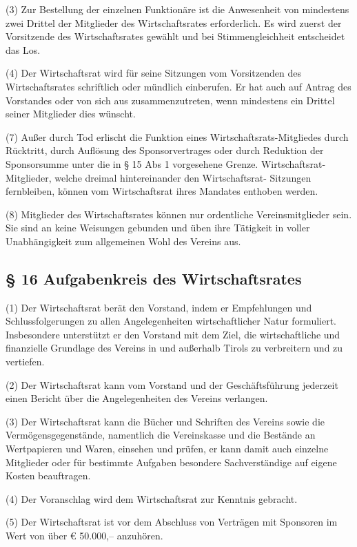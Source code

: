 \documentclass[10pt,a4paper]{article}
\begin{document}
(3)
Zur Bestellung der einzelnen Funktionäre ist die Anwesenheit von mindestens zwei Drittel der Mitglieder des Wirtschaftsrates erforderlich.
Es wird zuerst der Vorsitzende des Wirtschaftsrates gewählt und bei Stimmengleichheit entscheidet das Los.

(4)
Der Wirtschaftsrat wird für seine Sitzungen vom Vorsitzenden des Wirtschaftsrates schriftlich oder mündlich einberufen.
Er hat auch auf Antrag des Vorstandes oder von sich aus zusammenzutreten, wenn mindestens ein Drittel seiner Mitglieder dies wünscht.

(7)
Außer durch Tod erlischt die Funktion eines Wirtschaftsrats-Mitgliedes durch Rücktritt, durch Auflösung des Sponsorvertrages oder durch Reduktion der Sponsorsumme unter die in § 15 Abs 1 vorgesehene Grenze.
Wirtschaftsrat-Mitglieder, welche dreimal hintereinander den Wirtschaftsrat- Sitzungen fernbleiben, können vom Wirtschaftsrat ihres Mandates enthoben werden.

(8)
Mitglieder des Wirtschaftsrates können nur ordentliche Vereinsmitglieder sein.
Sie sind an keine Weisungen gebunden und üben ihre Tätigkeit in voller Unabhängigkeit zum allgemeinen Wohl des Vereins aus.

\subsection{§ 16
Aufgabenkreis des Wirtschaftsrates}

(1)
Der Wirtschaftsrat berät den Vorstand, indem er Empfehlungen und Schlussfolgerungen zu allen Angelegenheiten wirtschaftlicher Natur formuliert.
Insbesondere unterstützt er den Vorstand mit dem Ziel, die wirtschaftliche und finanzielle Grundlage des Vereins in und außerhalb Tirols zu verbreitern und zu vertiefen.

(2)
Der Wirtschaftsrat kann vom Vorstand und der Geschäftsführung jederzeit einen Bericht über die Angelegenheiten des Vereins verlangen.

(3)
Der Wirtschaftsrat kann die Bücher und Schriften des Vereins sowie die Vermögensgegenstände, namentlich die Vereinskasse und die Bestände an Wertpapieren und Waren, einsehen und prüfen, er kann damit auch einzelne Mitglieder oder für bestimmte Aufgaben besondere Sachverständige auf eigene Kosten beauftragen.

(4)
Der Voranschlag wird dem Wirtschaftsrat zur Kenntnis gebracht.

(5)
Der Wirtschaftsrat ist vor dem Abschluss von Verträgen mit Sponsoren im Wert von über € 50.000,-- anzuhören.
\end{document}
